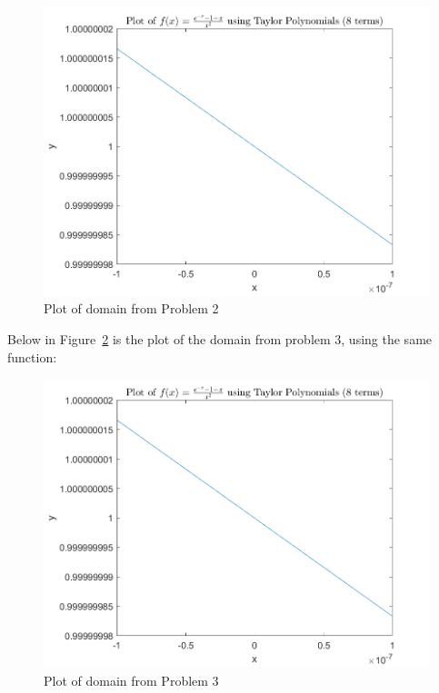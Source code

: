 \documentclass[11pt]{article}
\begin{document}
\begin{figure}[h!]
\centering
\includegraphics[width=\linewidth]{Lab1BQ4p1q2.png}  %
\caption{Plot of domain from Problem 2}
\label{fig:q41}
\end{figure}

Below in Figure~\ref{fig:q42} is the plot of the domain from problem 3, using the same function:

\begin{figure}[h!]
\centering
\includegraphics[width=\linewidth]{Lab1BQ4p1q3.png}  %
\caption{Plot of domain from Problem 3}
\label{fig:q42}
\end{figure}
\end{document}
